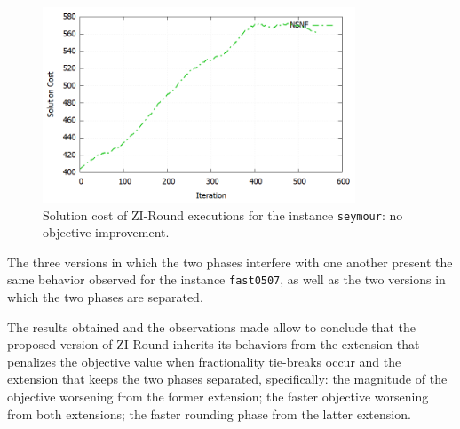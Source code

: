 \documentclass[a4paper,12pt,twoside]{scrbook}
\begin{document}
\begin{figure}[h!]
	\centering
	\includegraphics[width=0.83\textwidth]{seymour-solcost-nsnf.png}
	\caption{Solution cost of ZI-Round executions for the instance \texttt{seymour}: no objective improvement.}
	\label{fig:seymour-solcost-nsnf}
\end{figure}

The three versions in which the two phases interfere with one another present the same behavior observed for the instance \texttt{fast0507}, as well as the two versions in which the two phases are separated. \par 

The results obtained and the observations made allow to conclude that the proposed version of ZI-Round inherits its behaviors from the extension that penalizes the objective value when fractionality tie-breaks occur and the extension that keeps the two phases separated, specifically: the magnitude of the objective worsening from the former extension; the faster objective worsening from both extensions; the faster rounding phase from the latter extension.



\end{document}

